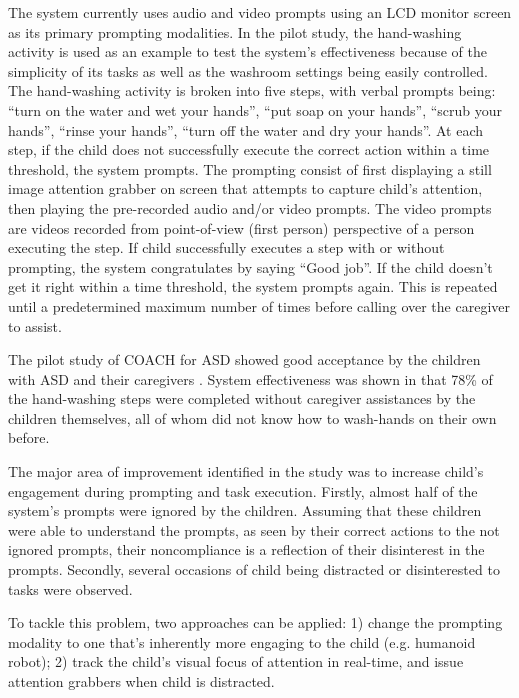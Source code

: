 The system currently uses audio and video prompts using an LCD monitor screen as its primary prompting modalities.  In the pilot study, the hand-washing activity is used as an example to test the system's effectiveness because of the simplicity of its tasks as well as the washroom settings being easily controlled.  The hand-washing activity is broken into five steps, with verbal prompts being: ``turn on the water and wet your hands'', ``put soap on your hands'', ``scrub your hands'', ``rinse your hands'', ``turn off the water and dry your hands''.  At each step, if the child does not successfully execute the correct action within a time threshold, the system prompts.  The prompting consist of first displaying a still image attention grabber on screen that attempts to capture child's attention, then playing the pre-recorded audio and/or video prompts.  The video prompts are videos recorded from point-of-view (first person) perspective of a person executing the step.  If child successfully executes a step with or without prompting, the system congratulates by saying ``Good job''.  If the child doesn't get it right within a time threshold, the system prompts again.  This is repeated until a predetermined maximum number of times before calling over the caregiver to assist.  


The pilot study of COACH for ASD showed good acceptance by the children with ASD and their caregivers \cite{bimbrahw2012investigating}.  System effectiveness was shown in that 78\% of the hand-washing steps were completed without caregiver assistances by the children themselves, all of whom did not know how to wash-hands on their own before.


The major area of improvement identified in the study was to increase child's engagement during prompting and task execution.  Firstly, almost half of the system's prompts were ignored by the children.  Assuming that these children were able to understand the prompts, as seen by their correct actions to the not ignored prompts, their noncompliance is a reflection of their disinterest in the prompts.  Secondly, several occasions of child being distracted or disinterested to tasks were observed.


To tackle this problem, two approaches can be applied: 1) change the prompting modality to one that's inherently more engaging to the child (e.g. humanoid robot); 2) track the child's visual focus of attention in real-time, and issue attention grabbers when child is distracted.
